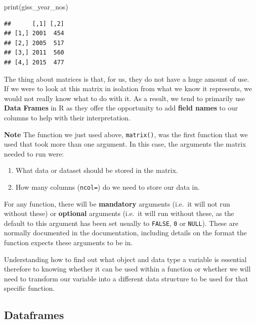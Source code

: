\documentclass[
]{book}
\newenvironment{Shaded}{\begin{snugshade}}{\end{snugshade}}
\newcommand{\FunctionTok}[1]{\textcolor[rgb]{0.00,0.00,0.00}{#1}}
\newcommand{\NormalTok}[1]{#1}
\providecommand{\tightlist}{%
  \setlength{\itemsep}{0pt}\setlength{\parskip}{0pt}}
\begin{document}
\begin{Shaded}
\begin{Highlighting}[]
\FunctionTok{print}\NormalTok{(giss\_year\_nos)}
\end{Highlighting}
\end{Shaded}

\begin{verbatim}
##      [,1] [,2]
## [1,] 2001  454
## [2,] 2005  517
## [3,] 2011  560
## [4,] 2015  477
\end{verbatim}

The thing about matrices is that, for us, they do not have a huge amount of use. If we were to look at this matrix in isolation from what we know it represents, we would not really know what to do with it. As a result, we tend to primarily use \textbf{Data Frames} in R as they offer the opportunity to add \textbf{field names} to our columns to help with their interpretation.

\textbf{Note}
The function we just used above, \texttt{matrix()}, was the first function that we used that took more than one argument.
In this case, the arguments the matrix needed to run were:

\begin{enumerate}
\def\labelenumi{\arabic{enumi}.}
\tightlist
\item
  What data or dataset should be stored in the matrix.
\item
  How many columns (\texttt{ncol=}) do we need to store our data in.
\end{enumerate}

For any function, there will be \textbf{mandatory} arguments (i.e.~it will not run without these) or \textbf{optional} arguments (i.e.~it will run without these, as the default to this argument has been set usually to \texttt{FALSE}, \texttt{0} or \texttt{NULL}). These are normally documented in the documentation, including details on the format the function expects these arguments to be in.

Understanding how to find out what object and data type a variable is essential therefore to knowing whether it can be used within a function or whether we will need to transform our variable into a different data structure to be used for that specific function.

\hypertarget{dataframes}{%
\subsection{Dataframes}\label{dataframes}}
\end{document}
